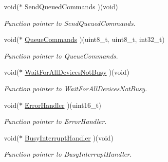 \begin{DoxyCompactItemize}
\mbox{\label{structmotor_drv__t_a21e2ce008a66390b36e862c79245186a}} 
void($\ast$ \mbox{\hyperlink{structmotor_drv__t_a21e2ce008a66390b36e862c79245186a}{Send\+Queued\+Commands}} )(void)
\begin{DoxyCompactList}\small\item\em Function pointer to Send\+Queued\+Commands. \end{DoxyCompactList}\item 
\mbox{\label{structmotor_drv__t_aa06be40777c47f07eeb64fbfb73e2e83}} 
void($\ast$ \mbox{\hyperlink{structmotor_drv__t_aa06be40777c47f07eeb64fbfb73e2e83}{Queue\+Commands}} )(uint8\+\_\+t, uint8\+\_\+t, int32\+\_\+t)
\begin{DoxyCompactList}\small\item\em Function pointer to Queue\+Commands. \end{DoxyCompactList}\item 
\mbox{\label{structmotor_drv__t_a69ebb6a2431f60266e98c61aafb06f42}} 
void($\ast$ \mbox{\hyperlink{structmotor_drv__t_a69ebb6a2431f60266e98c61aafb06f42}{Wait\+For\+All\+Devices\+Not\+Busy}} )(void)
\begin{DoxyCompactList}\small\item\em Function pointer to Wait\+For\+All\+Devices\+Not\+Busy. \end{DoxyCompactList}\item 
\mbox{\label{structmotor_drv__t_a0a4a3d233d342fe4070479d87212ab42}} 
void($\ast$ \mbox{\hyperlink{structmotor_drv__t_a0a4a3d233d342fe4070479d87212ab42}{Error\+Handler}} )(uint16\+\_\+t)
\begin{DoxyCompactList}\small\item\em Function pointer to Error\+Handler. \end{DoxyCompactList}\item 
\mbox{\label{structmotor_drv__t_a0942081bee6e9c3d7e62e63ac38d9564}} 
void($\ast$ \mbox{\hyperlink{structmotor_drv__t_a0942081bee6e9c3d7e62e63ac38d9564}{Busy\+Interrupt\+Handler}} )(void)
\begin{DoxyCompactList}\small\item\em Function pointer to Busy\+Interrupt\+Handler. \end{DoxyCompactList}\item 

\end{DoxyCompactItemize}
